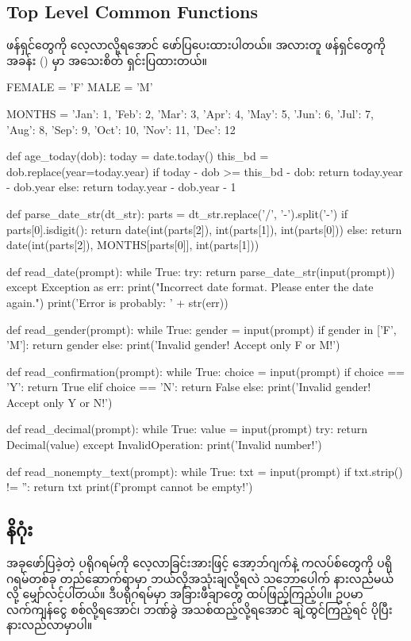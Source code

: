 \subsection*{Top Level Common Functions}
 ဖန်ရှင်တွေကို လေ့လာလို့ရအောင် ဖော်ပြပေးထားပါတယ်။  အလားတူ ဖန်ရှင်တွေကို  အခန်း (\fRefNo{\ref{ch:ch08Funs}}) မှာ အသေးစိတ် ရှင်းပြထားတယ်။
%
\begin{py}
FEMALE = 'F'
MALE = 'M'

MONTHS = {'Jan': 1, 'Feb': 2, 'Mar': 3, 'Apr': 4,
          'May': 5, 'Jun': 6, 'Jul': 7, 'Aug': 8,
          'Sep': 9, 'Oct': 10, 'Nov': 11, 'Dec': 12}


def age_today(dob):
    today = date.today()
    this_bd = dob.replace(year=today.year)
    if today - dob >= this_bd - dob:
        return today.year - dob.year
    else:
        return today.year - dob.year - 1


def parse_date_str(dt_str):
    parts = dt_str.replace('/', '-').split('-')
    if parts[0].isdigit():
        return date(int(parts[2]), int(parts[1]), int(parts[0]))
    else:
        return date(int(parts[2]), MONTHS[parts[0]], int(parts[1]))


def read_date(prompt):
    while True:
        try:
            return parse_date_str(input(prompt))
        except Exception as err:
            print("Incorrect date format. Please enter the date again.")
            print('Error is probably: ' + str(err))


def read_gender(prompt):
    while True:
        gender = input(prompt)
        if gender in ['F', 'M']:
            return gender
        else:
            print('Invalid gender! Accept only F or M!')


def read_confirmation(prompt):
    while True:
        choice = input(prompt)
        if choice == 'Y':
            return True
        elif choice == 'N':
            return False
        else:
            print('Invalid gender! Accept only Y or N!')


def read_decimal(prompt):
    while True:
        value = input(prompt)
        try:
            return Decimal(value)
        except InvalidOperation:
            print('Invalid number!')


def read_nonempty_text(prompt):
    while True:
        txt = input(prompt)
        if txt.strip() != '':
            return txt
        print(f'{prompt} cannot be empty!')
\end{py}
%
\subsection*{နိဂုံး}
အခုဖော်ပြခဲ့တဲ့ ပရိုဂရမ်ကို လေ့လာခြင်းအားဖြင့် အော့ဘ်ဂျက်နဲ့ ကလပ်စ်တွေကို ပရိုဂရမ်တစ်ခု တည်\allowbreak ဆောက်ရာမှာ ဘယ်လိုအသုံးချလို့ရလဲ သဘောပေါက် နားလည်မယ်လို့ မျှော်လင့်ပါတယ်။ ဒီပရိုဂရမ်မှာ အခြားဖီချာတွေ ထပ်ဖြည့်ကြည့်ပါ။ ဥပမာ လက်ကျန်ငွေ စစ်လို့ရအောင်၊ ဘဏ်ခွဲ အသစ်ထည့်လို့ရအောင် ချဲ့ထွင်ကြည့်ရင် ပိုပြီး နားလည်လာမှာပါ။
